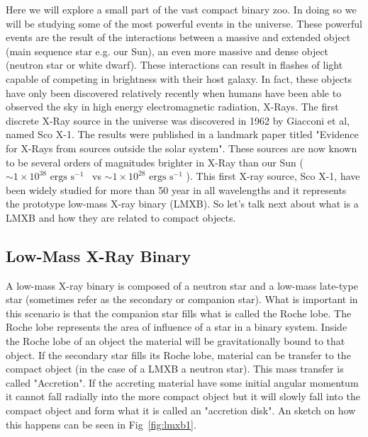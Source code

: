 Here we will explore a small part of the vast compact binary zoo. In doing so we will be studying some of the most powerful events in the universe. These powerful events are the result of the interactions between a massive and extended object (main sequence star e.g. our Sun), an even more massive and dense object (neutron star or white dwarf).  These interactions can result in flashes of light capable of competing in brightness with their host galaxy. In fact, these objects have only been discovered relatively recently when humans have been able to observed the sky in high energy electromagnetic radiation, X-Rays. The first discrete X-Ray source in the universe was discovered in 1962 by Giacconi et al, named Sco X-1. The results were published in a landmark paper titled "Evidence for X-Rays from sources outside the solar system". These sources are now known to be several orders of magnitudes brighter in X-Ray than our Sun ($\sim 1 \times 10^{38} \text{ ergs s}^{-1}$~\citep{firstxray} vs $\sim 1 \times 10^{28} \text{ ergs s}^{-1}$ \citep{sunxray}). This first X-ray source, Sco X-1, have been widely studied for more than 50 year in all wavelengths and it represents the prototype low-mass X-ray binary (LMXB). So let's talk next about what is a LMXB and how they are related to compact objects.  


\subsection{Low-Mass X-Ray Binary}

A low-mass X-ray binary is composed of a neutron star and a low-mass late-type star (sometimes refer as the secondary or companion star). What is important in this scenario is that the companion star fills what is called the Roche lobe. The Roche lobe represents the area of influence of a star in a binary system. Inside the Roche lobe of an object the material will be gravitationally bound to that object. If the secondary star fills its Roche lobe, material can be transfer to the compact object (in the case of a LMXB a neutron star). This mass transfer is called "Accretion". If the accreting material have some initial angular momentum it cannot fall radially into the more compact object but it will slowly fall into the compact object and form what it is called an "accretion disk". An sketch on how this happens can be seen in Fig~\ref{fig:lmxb1}.

